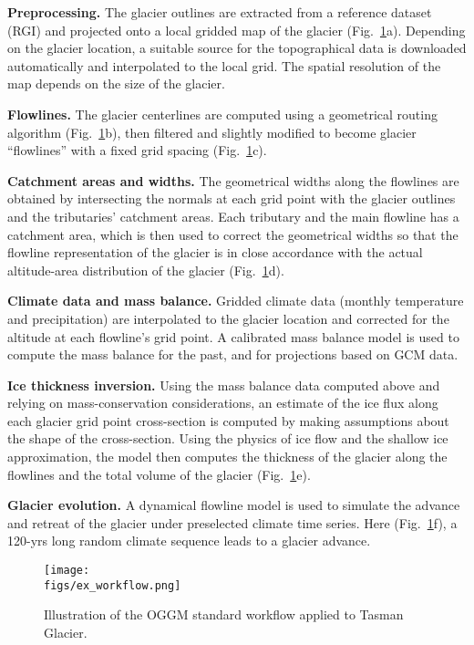 \textbf{Preprocessing.}
The glacier outlines are extracted from a reference dataset (RGI)
and projected onto a local gridded map of the glacier (Fig.~\ref{fig:flow}a). Depending on the glacier location, a suitable source
for the topographical data is downloaded automatically and interpolated to the local grid. The spatial resolution of the
map depends on the size of the glacier.

\textbf{Flowlines.}
The glacier centerlines are computed using a geometrical routing algorithm
(Fig.~\ref{fig:flow}b), then filtered and slightly modified to become glacier “flowlines”
with a fixed grid spacing (Fig.~\ref{fig:flow}c).

\textbf{Catchment areas and widths.}
The geometrical widths along the flowlines are obtained by intersecting the normals at each grid point with the glacier
outlines and the tributaries’ catchment areas. Each tributary and the main flowline has a catchment area, which is then
used to correct the geometrical widths so that the flowline representation of the glacier is in close accordance with
the actual altitude-area distribution of the glacier (Fig.~\ref{fig:flow}d).

\textbf{Climate data and mass balance.}
Gridded climate data (monthly temperature and precipitation) are interpolated to the glacier location and corrected for
the altitude at each flowline’s grid point. A calibrated mass balance model is used to compute the mass balance for the
past, and for projections based on GCM data.

\textbf{Ice thickness inversion.}
Using the mass balance data computed above and relying on mass-conservation considerations, an estimate of the ice flux
along each glacier grid point cross-section is computed by making assumptions about the shape of the cross-section.
Using the physics of ice flow and the shallow ice approximation, the model then computes the thickness of the glacier
along the flowlines and the total volume of the glacier (Fig.~\ref{fig:flow}e).

\textbf{Glacier evolution.}
A dynamical flowline model is used to simulate the advance and retreat of the glacier under preselected climate time
series. Here (Fig.~\ref{fig:flow}f), a 120-yrs long random climate sequence leads to a glacier advance.


\begin{figure}[h]
\centering
\texttt{[image: \\figs/ex\_workflow.png]}
\caption{Illustration of the OGGM standard workflow applied to Tasman Glacier.}
\label{fig:flow}
\end{figure}


